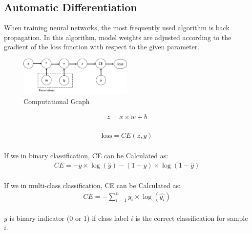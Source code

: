 \documentclass[12pt,hyperref,a4paper,UTF8]{article}
\begin{document}
\subsection{Automatic Differentiation}
\textbf{} When training neural networks, the most frequently used algorithm is back propagation. In this algorithm, model weights are adjusted according to the gradient of the loss function with respect to the given parameter.

\begin{figure}[h]
    \centering
    \includegraphics[width=0.5\textwidth]{figures/comp-graph.png}
    \caption{Computational Graph}
\end{figure}
\begin{equation}\label{eq:1}
    \begin{aligned}
        z = x \times w + b\\
    \end{aligned}
\end{equation}

\begin{equation}\label{eq:2}
    \begin{aligned}
        \text{loss} = CE(z,y)\\
    \end{aligned}
\end{equation}

If we in binary classification, CE can be Calculated as:
\begin{equation}\label{eq:3}
    \begin{aligned}
        CE = -y \times \log(\hat{y}) - (1-y) \times \log(1-\hat{y})\\
    \end{aligned}
\end{equation}

If we in multi-class classification, CE can be Calculated as:
\begin{equation}\label{eq:4}
    \begin{aligned}
        CE = -\sum_{i=1}^{n} y_i \times \log(\hat{y_i})\\
    \end{aligned}
\end{equation}

$y$ is binary indicator (0 or 1) if class label $i$ is the correct classification for sample $i$.\\
\end{document}
